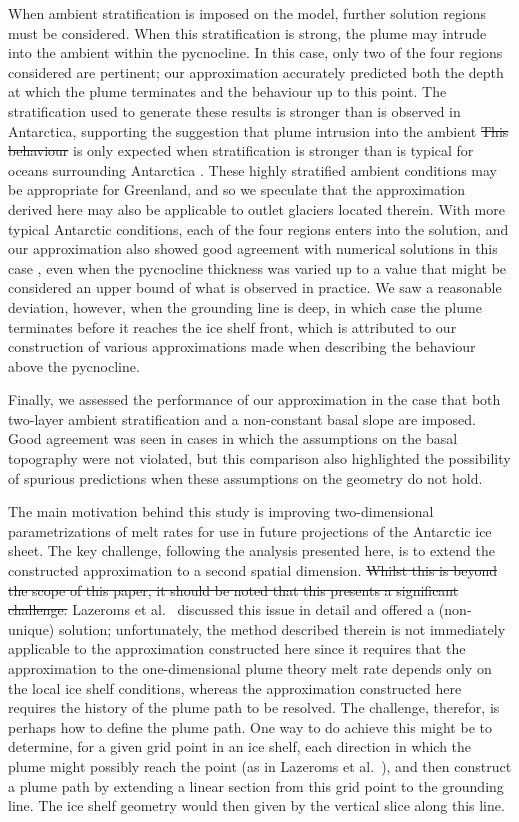\documentclass[openacc]{rsproca_new}%
\newcommand{\red}[1]{{\color{red} #1}}
\newcommand{\blue}[1]{{\color{blue} #1}}
\newcommand{\rout}[1]{\red{\st{#1}}}\newcommand{\ab}[1]{\textcolor{Green}{#1}}\newcommand{\about}[1]{\textcolor{Cyan}{\sout{#1}}}
\begin{document}
When ambient stratification is imposed on the model, further solution regions must be considered. When this stratification is strong, the plume may intrude into the ambient within the pycnocline. In this case, only two of the four regions considered are pertinent; our approximation accurately predicted both the depth at which the plume terminates and the behaviour up to this point. \blue{The stratification used to generate these results is stronger than is observed in Antarctica, supporting the suggestion that plume intrusion into the ambient}\rout{ This behaviour} is only expected when stratification is stronger than is typical for oceans surrounding Antarctica\blue{. These highly stratified ambient conditions may be appropriate for Greenland, and so we speculate  that the approximation derived here may also be applicable to outlet glaciers located therein.} With more typical Antarctic conditions, each of the four regions enters into the solution, and our approximation also showed good agreement with numerical solutions in this case\blue{, even when the pycnocline thickness was varied up to a value that might be considered an upper bound of what is observed in practice}. We saw a reasonable deviation, however, when the grounding line is deep, in which case the plume terminates before it reaches the ice shelf front, which is attributed to our construction of various approximations made when describing the behaviour above the pycnocline.

Finally, we assessed the performance of our approximation in the case that both two-layer ambient stratification and a non-constant basal slope are imposed. Good agreement was seen in cases in which the assumptions on the basal topography were not violated, but this comparison also highlighted the possibility of spurious predictions when these assumptions on the geometry do not hold.

%
The main motivation behind this study is improving two-dimensional parametrizations of melt rates for use in future projections of the Antarctic ice sheet. The key challenge, following the analysis presented here, is to extend the constructed approximation to a second spatial dimension. \rout{Whilst this is beyond the scope of this paper, it should be noted that this presents a significant challenge.} Lazeroms et al.~\cite{Lazeroms2018TheCryo} discussed this issue in detail and offered a (non-unique) solution; unfortunately, the method described therein is not immediately applicable to the approximation constructed here since it requires that the approximation to the one-dimensional plume theory melt rate depends only on the local ice shelf conditions, whereas the approximation constructed here requires the history of the plume path to be resolved. \blue{The challenge, therefor, is perhaps how to define the plume path. One way to do achieve this might be to determine, for a given grid point in an ice shelf, each direction in which the plume might possibly reach the point (as in Lazeroms et al.~\cite{Lazeroms2018TheCryo}), and then construct a plume path by extending a linear section from this grid point to the grounding line. The ice shelf geometry would then given by the vertical slice along this line. }
\end{document}
